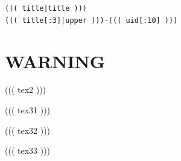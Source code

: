 \documentclass{article}
\begin{document}
\begin{flushright}
\scriptsize{
  \texttt{((( title|title ))) \\ ((( title[:3]|upper )))-((( uid[:10] )))}
}
\end{flushright}

\clearpage


\section*{WARNING}

((( tex2 )))

\vspace{12pt}

((( tex31 )))

((( tex32 )))

((( tex33 )))

\clearpage

\end{document}
